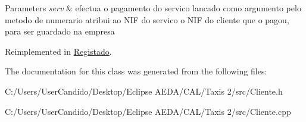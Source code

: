 \begin{DoxyParams}{Parameters}
{\em serv} & efectua o pagamento do servico lancado como argumento pelo metodo de numerario atribui ao N\+IF do servico o N\+IF do cliente que o pagou, para ser guardado na empresa \\
\hline
\end{DoxyParams}


Reimplemented in \hyperlink{class_registado_af3c8f63f7df1cdfd27e44126f78b71d8}{Registado}.



The documentation for this class was generated from the following files\+:\begin{DoxyCompactItemize}
\item 
C\+:/\+Users/\+User\+Candido/\+Desktop/\+Eclipse A\+E\+D\+A/\+C\+A\+L/\+Taxis 2/src/Cliente.\+h\item 
C\+:/\+Users/\+User\+Candido/\+Desktop/\+Eclipse A\+E\+D\+A/\+C\+A\+L/\+Taxis 2/src/Cliente.\+cpp\end{DoxyCompactItemize}
